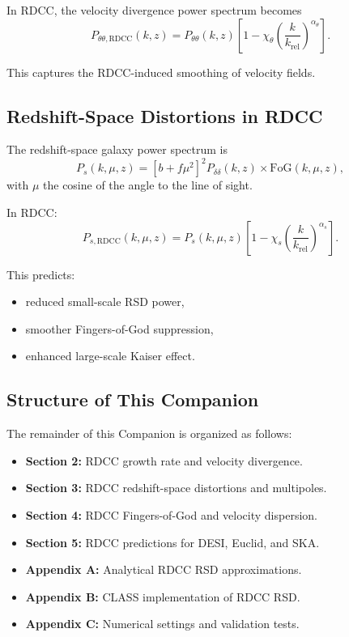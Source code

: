 \documentclass[11pt,a4paper]{article}
\begin{document}
In RDCC, the velocity divergence power spectrum becomes
\begin{equation}
P_{\theta\theta,\mathrm{RDCC}}(k,z)
=
P_{\theta\theta}(k,z)
\left[
1
-
\chi_{\theta}
\left(
\frac{k}{k_{\mathrm{rel}}}
\right)^{\alpha_{\theta}}
\right].
\end{equation}

This captures the RDCC-induced smoothing of velocity fields.

\subsection{Redshift-Space Distortions in RDCC}

The redshift-space galaxy power spectrum is
\begin{equation}
P_{s}(k,\mu,z)
=
\left[
b + f\mu^{2}
\right]^{2}
P_{\delta\delta}(k,z)
\times
\mathrm{FoG}(k,\mu,z),
\end{equation}
with $\mu$ the cosine of the angle to the line of sight.

In RDCC:
\begin{equation}
P_{s,\mathrm{RDCC}}(k,\mu,z)
=
P_{s}(k,\mu,z)
\left[
1
-
\chi_{s}
\left(
\frac{k}{k_{\mathrm{rel}}}
\right)^{\alpha_{s}}
\right].
\end{equation}

This predicts:
\begin{itemize}
\item reduced small-scale RSD power,
\item smoother Fingers-of-God suppression,
\item enhanced large-scale Kaiser effect.
\end{itemize}

\subsection{Structure of This Companion}

The remainder of this Companion is organized as follows:

\begin{itemize}
\item \textbf{Section 2:} RDCC growth rate and velocity divergence.
\item \textbf{Section 3:} RDCC redshift-space distortions and multipoles.
\item \textbf{Section 4:} RDCC Fingers-of-God and velocity dispersion.
\item \textbf{Section 5:} RDCC predictions for DESI, Euclid, and SKA.
\item \textbf{Appendix A:} Analytical RDCC RSD approximations.
\item \textbf{Appendix B:} CLASS implementation of RDCC RSD.
\item \textbf{Appendix C:} Numerical settings and validation tests.
\end{itemize}
\end{document}
